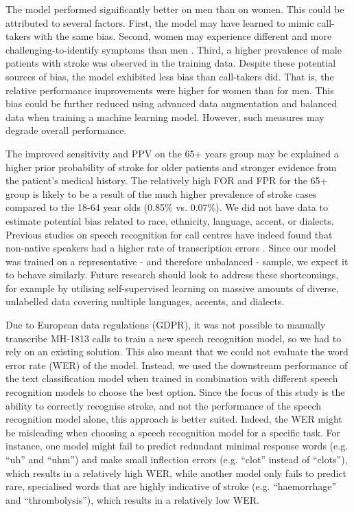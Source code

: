 {The model performed significantly better on men than on women. This could be attributed to several factors. First, the model may have learned to mimic call-takers with the same bias. Second, women may experience different and more challenging-to-identify symptoms than men \cite{cite29, cite30}. Third, a higher prevalence of male patients with stroke was observed in the training data. Despite these potential sources of bias, the model exhibited less bias than call-takers did. That is, the relative performance improvements were higher for women than for men. This bias could be further reduced using advanced data augmentation and balanced data when training a machine learning model. However, such measures may degrade overall performance.

The improved sensitivity and PPV on the 65+ years group may be explained a higher prior probability of stroke for older patients and stronger evidence from the patient's medical history. The relatively high FOR and FPR for the 65+ group is likely to be a result of the much higher prevalence of stroke cases compared to the 18-64 year olds (0.85\% vs. 0.07\%). We did not have data to estimate potential bias related to race, ethnicity, language, accent, or dialects. Previous studies on speech recognition for call centres have indeed found that non-native speakers had a higher rate of transcription errors \cite{han_deep_2017}. Since our model was trained on a representative - and therefore unbalanced - sample, we expect it to behave similarly. Future research should look to address these shortcomings, for example by utilising self-supervised learning on massive amounts of diverse, unlabelled data covering multiple languages, accents, and dialects.

Due to European data regulations (GDPR), it was not possible to manually transcribe MH-1813 calls to train a new speech recognition model, so we had to rely on an existing solution. This also meant that we could not evaluate the word error rate (WER) of the model. Instead, we used the downstream performance of the text classification model when trained in combination with different speech recognition models to choose the best option. Since the focus of this study is the ability to correctly recognise stroke, and not the performance of the speech recognition model alone, this approach is better suited. Indeed, the WER might be misleading when choosing a speech recognition model for a specific task. For instance, one model might fail to predict redundant minimal response words (e.g. “uh” and “uhm”) and make small inflection errors (e.g. “clot” instead of “clots”), which results in a relatively high WER, while another model only fails to predict rare, specialised words that are highly indicative of stroke (e.g. “haemorrhage” and “thrombolysis”), which results in a relatively low WER.

}

